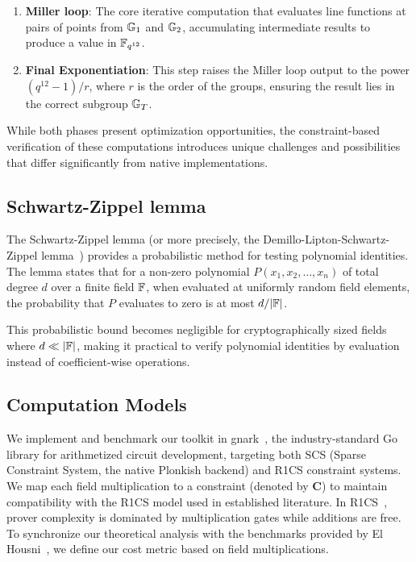 \begin{enumerate}
    \item \textbf{Miller loop}: The core iterative computation that evaluates line functions at pairs of points from $\mathbb{G}_1$ and $\mathbb{G}_2$, accumulating intermediate results to produce a value in $\mathbb{F}_{q^{12}}$.
    
    \item \textbf{Final Exponentiation}: This step raises the Miller loop output to the power $(q^{12}-1)/r$, where $r$ is the order of the groups, ensuring the result lies in the correct subgroup $\mathbb{G}_T$.
\end{enumerate}

While both phases present optimization opportunities, the constraint-based verification of these computations introduces unique challenges and possibilities that differ significantly from native implementations.

\subsection{Schwartz-Zippel lemma}\label{sec:bg:sz}

The Schwartz-Zippel lemma (or more precisely, the Demillo-Lipton-Schwartz-Zippel lemma~\cite{DemLip78,Sch79,Zip79,Sch80}) provides a probabilistic method for testing polynomial identities. The lemma states that for a non-zero polynomial $P(x_1, x_2, \ldots, x_n)$ of total degree $d$ over a finite field $\mathbb{F}$, when evaluated at uniformly random field elements, the probability that $P$ evaluates to zero is at most $d/|\mathbb{F}|$.

This probabilistic bound becomes negligible for cryptographically sized fields where $d \ll |\mathbb{F}|$, making it practical to verify polynomial identities by evaluation instead of coefficient-wise operations.

\subsection{Computation Models}

We implement and benchmark our toolkit in gnark~\cite{gnark}, the industry-standard Go library for arithmetized circuit development, targeting both SCS (Sparse Constraint System, the native Plonkish backend) and R1CS constraint systems. We map each field multiplication to a constraint (denoted by \textbf{C}) to maintain compatibility with the R1CS model used in established literature. In R1CS~\cite{Gro16}, prover complexity is dominated by multiplication gates while additions are free. To synchronize our theoretical analysis with the benchmarks provided by El Housni~\cite{PR1CS22}, we define our cost metric based on field multiplications.

